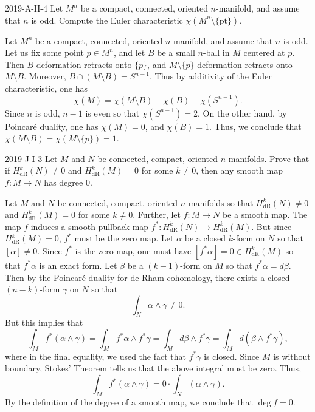 \documentclass{article}
\begin{document}
	\begin{prb}{2019-A-II-4}
		Let $M^{n}$ be a compact, connected, oriented $n$-manifold, and assume that $n$ is odd. Compute the Euler characteristic $\chi(M^{n}\setminus \{\text{pt}\})$. 
	\end{prb}
	Let $M^{n}$ be a compact, connected, oriented $n$-manifold, and assume that $n$ is odd. Let us fix some point $p \in M^{n}$, and let $B$ be a small $n$-ball in $M$ centered at $p$. Then $B$ deformation retracts onto $\{p\}$, and $M \setminus \{p\}$ deformation retracts onto $M\setminus B$. Moreover, $B \cap (M \setminus B) = S^{n-1}$. Thus by additivity of the Euler characteristic, one has 
	\begin{equation*}
		\chi(M) = \chi(M\setminus B) + \chi(B) - \chi(S^{n-1}). 
	\end{equation*}
	Since $n$ is odd, $n - 1$ is even so that $\chi(S^{n-1}) = 2$. On the other hand, by Poincar\'e duality, one has $\chi(M) = 0$, and $\chi(B) = 1$. Thus, we conclude that $\chi(M \setminus B) = \chi(M \setminus \{p\}) = 1$. 
	
	
	\begin{prb}{2019-J-I-3}
		Let $M$ and $N$ be connected, compact, oriented $n$-manifolds. Prove that if $H^{k}_{\text{dR}}(N) \neq 0$ and $H^{k}_{\text{dR}}(M) = 0$ for some $k \neq 0$, then any smooth map $f: M \to N$ has degree 0. 
	\end{prb}
	Let $M$ and $N$ be connected, compact, oriented $n$-manifolds so that $H^{k}_{\text{dR}}(N) \neq 0$ and $H^{k}_{\text{dR}}(M) = 0$ for some $k \neq 0$. Further, let $f: M \to N$ be a smooth map. The map $f$ induces a smooth pullback map $f^{\ast}:H^{k}_{\text{dR}}(N) \to H^{k}_{\text{dR}}(M)$. But since $H^{k}_{\text{dR}}(M) = 0$, $f^{\ast}$ must be the zero map. Let $\alpha$ be a closed $k$-form on $N$ so that $[\alpha] \neq 0$. Since $f^{\ast}$ is the zero map, one must have $[f^{\ast}\alpha] =0 \in H^{k}_{\text{dR}}(M)$ so that $f^{\ast}\alpha$ is an exact form. Let $\beta$ be a $(k-1)$-form on $M$ so that $f^{\ast}\alpha = d\beta$. Then by the Poincar\'e duality for de Rham cohomology, there exists a closed $(n-k)$-form $\gamma$ on $N$ so that 
	\begin{equation*}
		\int_{N}\alpha \wedge \gamma \neq 0. 
	\end{equation*}
	But this implies that 
	\begin{equation*}
		\int_{M}f^{\ast}(\alpha \wedge \gamma) = \int_{M}f^{\ast}\alpha \wedge f^{\ast}\gamma = \int_{M}d\beta \wedge f^{\ast}\gamma = \int_{M}d(\beta \wedge f^{\ast}\gamma),  
	\end{equation*}
	where in the final equality, we used the fact that $f^{\ast}\gamma$ is closed. Since $M$ is without boundary, Stokes' Theorem tells us that the above integral must be zero. Thus, 
	\begin{equation*}
		\int_{M}f^{\ast}(\alpha \wedge \gamma) = 0 \cdot \int_{N}(\alpha \wedge \gamma). 
	\end{equation*}
	By the definition of the degree of a smooth map, we conclude that $\deg{f} = 0$.
	
\end{document}
